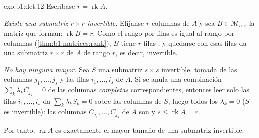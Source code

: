 \begin{solution}{exo:b1:det:12}
Escríbase $r = \operatorname{rk} A$.

\emph{Existe una submatriz $r \times r$ invertible.} Elíjanse $r$
columnas  de $A$ y sea $B \in \mathcal{M}_{n,r}$ la matriz
que forman: $\operatorname{rk} B = r$. Como el rango por filas es
igual al rango por columnas (\cref{thm:b1:matrices:rank}), $B$ tiene
$r$ filas ; y quedarse con esas filas da una submatriz
$r \times r$ de $A$ de rango $r$, es decir, invertible.

\emph{No hay ninguna mayor.} Sea $S$ una submatriz $s \times s$
invertible, tomada de las columnas $j_1, \dots, j_s$ y las filas
$i_1, \dots, i_s$ de $A$. Si se anula una combinación
$\sum_k \lambda_k C_{j_k} = 0$ de las columnas \emph{completas}
correspondientes, entonces leer solo las filas $i_1, \dots, i_s$ da
$\sum_k \lambda_k S_k = 0$ sobre las columnas de $S$, luego todos los
$\lambda_k = 0$ ($S$ es invertible): las columnas
$C_{j_1}, \dots, C_{j_s}$ de $A$ son  y
$s \leq \operatorname{rk} A = r$.

Por tanto, $\operatorname{rk} A$ es exactamente el mayor tamaño de
una submatriz invertible.
\end{solution}

